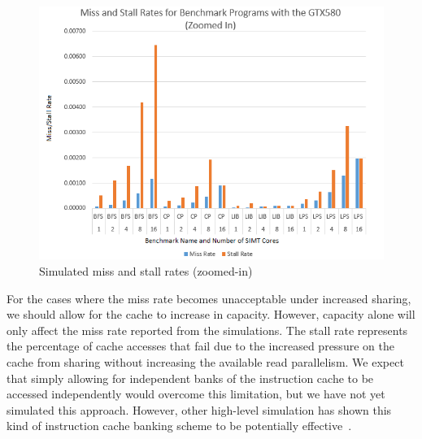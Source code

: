 \begin{figure}
\centering
\includegraphics[width=\columnwidth]{graphics/miss_stalls_benchmarks_zoomed.png}
\caption{Simulated miss and stall rates (zoomed-in) }
\label{fig:missStallsZoomed}
\end{figure}

For the cases where the miss rate becomes unacceptable under increased
sharing, we should allow for the cache to increase in
capacity. 
However, capacity alone will only affect the miss rate reported from
the simulations.
The stall rate represents the percentage of cache accesses that fail
due to the increased pressure on the cache from sharing without
increasing the available read parallelism.
We expect that simply allowing for independent banks of the
instruction cache to be accessed independently would overcome this
limitation, but we have not yet simulated this approach.
However, other high-level simulation has shown this kind of
instruction cache banking scheme to be potentially
effective~\cite{kopta10}. 




